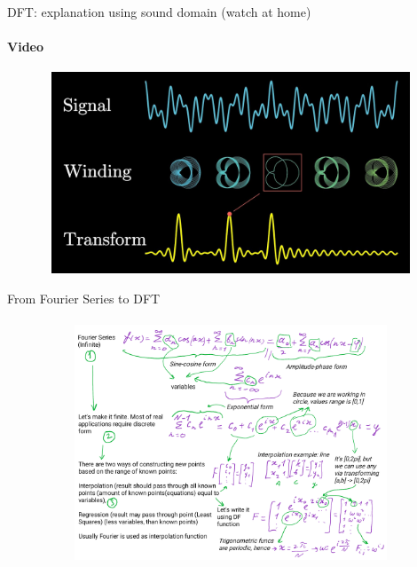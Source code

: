 \documentclass[aspectratio=169]{beamer}
\newcommand{\fbckg}[1]{\usebackgroundtemplate{\texttt{[image: \#1]}}}%
\begin{document}
\begin{frame}[t]{DFT: explanation using sound domain (watch at home)}
    \framesubtitle{Video}
    \vspace{-0.6cm}
    \begin{figure}[H]
        \href{https://youtu.be/spUNpyF58BY}{
            \centering\includegraphics[height=6cm,width=1\textwidth,keepaspectratio]{fourier_sound.jpg}}
        \label{fig:fourier_sound.jpg}
    \end{figure}
\end{frame}

\begin{frame}[t]{From Fourier Series to DFT}
\framesubtitle{}
\vspace{-0.75cm}
\begin{figure}[H]
    \centering\includegraphics[height=7cm,width=1\textwidth,keepaspectratio]{AGLA2_for_slides_9.png}
    \label{fig:AGLA2_for_slides_9.png}
\end{figure}
\end{frame}

\usebackgroundtemplate{}

\fbckg{fibeamer/figs/common.png}
\end{document}
